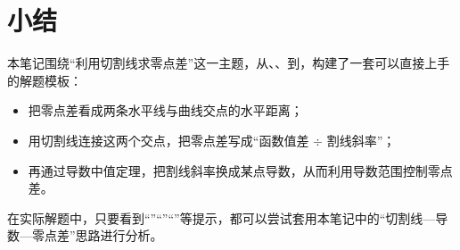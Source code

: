 \documentclass[a4paper,11pt]{ctexart}
\begin{document}
\newpage

\section*{小结}

本笔记围绕“利用切割线求零点差”这一主题，从、、到，构建了一套可以直接上手的解题模板：
\begin{itemize}
  \item 把零点差看成两条水平线与曲线交点的水平距离；
  \item 用切割线连接这两个交点，把零点差写成“函数值差 $\div$ 割线斜率”；
  \item 再通过导数中值定理，把割线斜率换成某点导数，从而利用导数范围控制零点差。
\end{itemize}

在实际解题中，只要看到“”“”“”等提示，都可以尝试套用本笔记中的“切割线—导数—零点差”思路进行分析。
\end{document}
